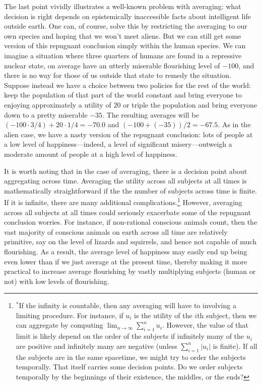 The last point vividly illustrates a well-known problem with averaging: what decision is right depends on epistemically
inaccessible facts about intelligent life outside earth. One can, of course, solve this by restricting the averaging
to our own species and hoping that we won't meet aliens. But we can still get
some version of this repugnant conclusion simply within the human species. We can imagine a situation where three quarters of humans 
are found in a repressive nuclear state, on average have an utterly miserable flourishing level of $-100$, and there is no way for those of us outside
that state to remedy the situation. Suppose instead we have a choice between two policies for the rest of the world: keep the 
population of that part of the world constant and bring everyone to enjoying approximately a utility of $20$ or triple the population 
and bring  everyone down to a pretty miserable $-35$. The resulting averages will be $(-100\cdot 3/4)+20\cdot 1/4 = -70.0$ and $(-100+(-35))/2 = -67.5$.
As in the alien case, we have a nasty version of the repugnant conclusion: lots of people at a low level of happiness---indeed, a level 
of significant misery---outweigh a moderate amount of people at a high level of happiness. 

It is worth noting that in the case of averaging, there is a decision point about aggregating across time. Averaging the utility 
across all subjects at all times is mathematically straightforward if the the number of subjects across time is finite. If it is infinite,
there are many additional complications.\footnote{$^*$If the infinity is countable, then any averaging will have to 
involving a limiting procedure. For instance, if $u_i$ is the utility of the $i$th subject, then we can aggregate by computing
$\lim_{n\to\infty} \sum_{i=1}^n u_i$. However, the value of that limit is likely depend on the order of the subjects if
infinitely many of the $u_i$ are positive and infinitely many are negative (unless $\sum_{i=1}^n |u_i|$ is finite).
If all the subjects are in the same spacetime, we might try to order the subjects temporally. That itself carries some decision
points. Do we order subjects temporally by the beginnings of their existence, the middles, or the ends?} However, averaging across all
subjects at all times could seriously exacerbate some of the repugnant conclusion worries. For instance, if non-rational 
conscious animals count, then the vast majority of conscious animals on earth across all time are relatively primitive,
say on the level of lizards and squirrels, and hence not capable of much flourishing. As a result, the average level of happiness
may easily end up being even lower than if we just average at the present time, thereby making it more practical to increase 
average flourishing by vastly multiplying subjects (human or not) with low levels of flourishing.

